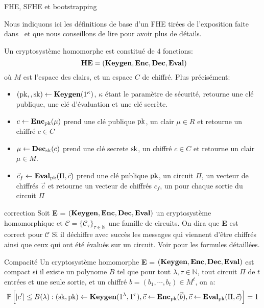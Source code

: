 \begin{section}{FHE, SFHE et bootstrapping}


Nous indiquons ici les définitions de base d'un FHE tirées de 
l'exposition faite dans~\cite{halevi} et que nous conseillons 
de lire pour avoir plus de détails.

\begin{definition}
Un cryptosystème homomorphe est constitué de $4$ fonctions:
\[ \text{\textbf{HE}} = (\Keygen, \Enc, \Dec, \Eval)\]
où $M$ est  l'espace des clairs, et un espace $C$ de chiffré. Plus précisément:
\begin{itemize}
\item $(\text{pk},, \text{sk}) \leftarrow \text{\textbf{Keygen}}(1^\kappa)$, $\kappa$ étant le paramètre de sécurité, retourne une clé publique, une clé d'évaluation et une clé secrète.
\item $c \leftarrow \text{\textbf{Enc}}_{\text{pk}}(\mu)$ prend une clé publique $\text{pk}$, un clair $\mu \in R$ et retourne un chiffré $c\in C$
\item $\mu \leftarrow \text{\textbf{Dec}}_{\text{sk}}(c)$ prend une clé secrete $\text{sk}$, un chiffré $c \in C$ et retourne un clair $\mu \in M$.
\item $\vec{c}_f \leftarrow \text{\textbf{Eval}}_{\text{pk}}(\Pi,\vec{c})$ prend une clé publique
$\text{pk}$, un circuit  $\Pi$, un vecteur de chiffrés $\vec{c}$ et retourne un
vecteur de chiffrés $c_f$, un pour chaque sortie du circuit $\Pi$
\end{itemize}
\end{definition}

\begin{definition}{correction}
Soit \textbf{E} = $(\text{\textbf{Keygen}}, \text{\textbf{Enc}}, \text{\textbf{Dec}}, \text{\textbf{Eval}})$ un cryptosystème homomorphique
et  $\mathcal{C} = \{ \mathcal{C}_\tau\}_{\tau \in \mathbb{N}}$ une famille de
circuits.  On dira que \textbf{E} est correct pour $\mathcal{C}$
Si il déchiffre avec succès les messages qui viennent d'être chiffrés 
ainsi que ceux qui ont été évalués sur un circuit. Voir \cite{halevi} pour les
formules détaillées.
\end{definition}

\begin{definition}{Compacité}
Un cryptosystème homomorphe \textbf{E} = $(\text{\textbf{Keygen}}, \text{\textbf{Enc}}, \text{\textbf{Dec}}, \text{\textbf{Eval}})$ 
est compact si il existe un polynome $B$ tel que pour tout $\lambda, \tau
\in \mathbb{N}$, tout circuit $\Pi$ de $t$ entrées et une seule sortie, et un
chiffré $b = (b_1,\cdots,b_t) \in M^t$, on a:
\[ 
\mathbb{P} \left[ |c'| \leq B(\lambda): (\text{sk},\text{pk}) \leftarrow \text{\textbf{Keygen}}(1^\lambda,
1^\tau), \vec{c} \leftarrow \text{\textbf{Enc}}_{\text{pk}}(\vec{b}), \vec{c} \leftarrow 
\text{\textbf{Eval}}_{\text{pk}}(\Pi, \vec{c}) \right] = 1
\]
\end{definition}


\end{section}
